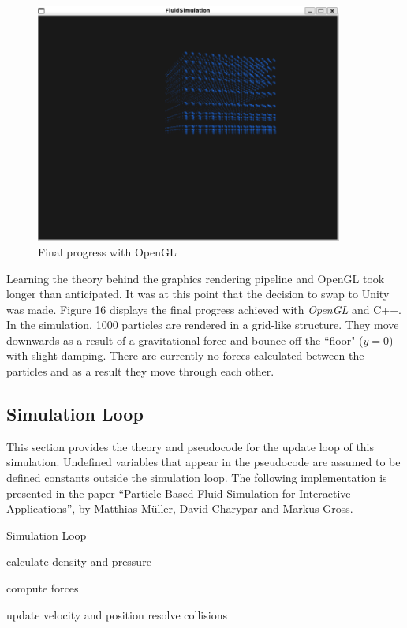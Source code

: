 \documentclass[12pt]{article}
\begin{document}
    \begin{figure}[H]
        \begin{center}
            \includegraphics[width=0.9\textwidth]{openGLProg.png}
            \caption{Final progress with OpenGL}
        \end{center}
    \end{figure}
    
    Learning the theory behind the graphics rendering pipeline and OpenGL took longer than anticipated. It was at this point that the decision to swap to Unity was made. Figure 16 displays the final progress achieved with \textit{OpenGL} and C++. In the simulation, 1000 particles are rendered in a grid-like structure. They move downwards as a result of a gravitational force and bounce off the ``floor" ($y = 0$) with slight damping. There are currently no forces calculated between the particles and as a result they move through each other.

    \subsection{Simulation Loop}

    This section provides the theory and pseudocode for the update loop of this simulation. Undefined variables that appear in the pseudocode are assumed to be defined constants outside the simulation loop. The following implementation is presented in the paper ``Particle-Based Fluid Simulation for Interactive Applications'', by Matthias Müller, David Charypar and Markus Gross\cite{sca}.

    \begin{algorithm}
        \caption{Simulation Loop}

        \begin{algorithmic}
                \State calculate density and pressure
            \EndFor

                \State compute forces
            \EndFor

                \State update velocity and position
                \State resolve collisions
            \EndFor
        \end{algorithmic}

    \end{algorithm}
\end{document}
